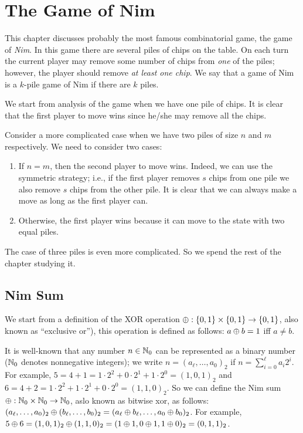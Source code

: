\chapter{The Game of Nim}

This chapter discusses probably the most famous combinatorial game, the game
of \emph{Nim}.
In this game there are several piles of chips on the table. On each turn
the current player may remove some number of chips from \emph{one} of the piles;
however, the player should remove \emph{at least one chip}.
We say that a game of Nim is a $k$-pile game of Nim if there are $k$ piles.

We start from analysis of the game when we have one pile of chips. It is clear
that the first player to move wins since he/she may remove all the chips.

Consider a more complicated case when we have two piles of size $n$ and $m$
respectively. We need to consider two cases:
\begin{enumerate}
  \item If $n = m$, then the second player to move wins. Indeed, we can
    use the symmetric strategy; i.e., if the first player removes $s$
    chips from one pile we also remove $s$ chips from the other pile.
    It is clear that we can always make a move as long as the first player can.
  \item Otherwise, the first player wins because it can move to the state
    with two equal piles.
\end{enumerate}

The case of three piles is even more complicated. So we spend the rest of the
chapter studying it.

\section{Nim Sum}

We start from a definition of the XOR operation
$\lxor : \set{0, 1} \times \set{0, 1} \to \set{0, 1}$,
also known as ``exclusive or''), this operation is defined as follows:
$a \oplus b = 1$ iff $a \neq b$.

It is well-known that any number $n \in {\mathbb{N}}_0$
can be represented as a binary number (${\mathbb{N}}_0$ denotes nonnegative integers);
we write $n = (a_\ell, \dots, a_0)_2$ if $n = \sum_{i = 0}^\ell a_i 2^i$.
For example,
$5 = 4 + 1 = 1 \cdot 2^2 + 0 \cdot 2^1 + 1 \cdot 2^0 = (1, 0, 1)_2$ and
$6 = 4 + 2 = 1 \cdot 2^2 + 1 \cdot 2^1 + 0 \cdot 2^0 = (1, 1, 0)_2$.
So we can define the Nim sum $\oplus : {\mathbb{N}}_0 \times {\mathbb{N}}_0 \to {\mathbb{N}}_0$, aslo
known as bitwise xor, as follows:
$(a_\ell, \dots, a_0)_2 \oplus (b_\ell, \dots, b_0)_2 =
    (a_\ell \oplus b_\ell, \dots, a_0 \oplus b_0)_2$.
For example, $5 \oplus 6 = (1, 0, 1)_2 \oplus (1, 1, 0)_2 =
(1 \oplus 1, 0 \oplus 1, 1 \oplus 0)_2 = (0, 1, 1)_2$.

